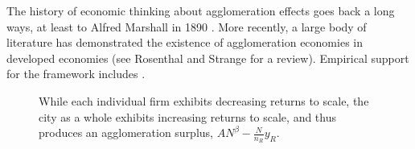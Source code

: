 The history of economic thinking about agglomeration effects goes back a long ways, at least to  Alfred Marshall in 1890 \cite{marshallPrinciplesEconomics1890}. %
More recently, a large body of literature has demonstrated the existence of agglomeration economies in developed economies (see Rosenthal and Strange \cite{rosenthalEvidenceNatureSources2004} for a review). Empirical support for the framework includes \cite{spenceUrbanizationGrowth2009, durantonAreCitiesEngines2009, durantonHumanCapitalExternalities2006}. 

\begin{figure}[htb]
    \centering

    \caption{While each individual firm exhibits decreasing returns to scale, the city as a whole exhibits increasing returns to scale, and thus produces an agglomeration surplus, $AN^\beta-\frac{N}{n_R}y_R$.}
    \label{fig-agglomeration-surplus} %
\end{figure}
 
